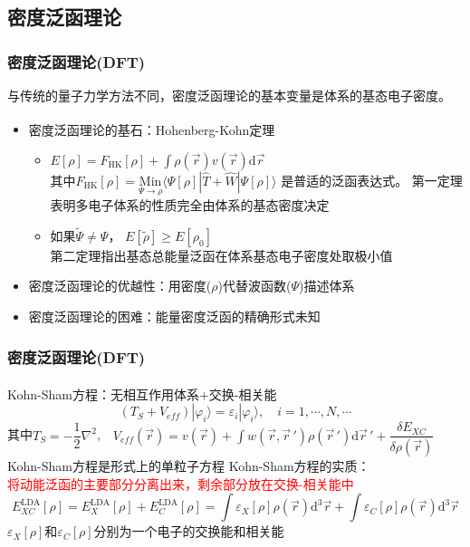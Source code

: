 \documentclass[cjk,slidestop,compress,mathserif,blue]{beamer}
\newcommand{\upcite}[1]{\hspace{0ex}\textsuperscript{\cite{#1}}} %
\begin{document}
\subsection{密度泛函理论}       %
\frame                               %
{
\frametitle{密度泛函理论(\textrm{DFT})} %
与传统的量子力学方法不同，密度泛函理论的基本变量是体系的基态电子密度。%
\begin{itemize}%
	\item 密度泛函理论的基石：\textrm{Hohenberg-Kohn}定理\upcite{PR136-B864_1964}
\vskip 5pt
\begin{itemize}%
   \setlength{\itemsep}{8pt}
 \item $E[\rho]=F_{\mathrm{HK}}[\rho]+\displaystyle\int\rho(\vec{r})v(\vec{r})\textrm{d}\vec{r}$ \\
\vskip 5pt 其中$F_{\mathrm{HK}}[\rho]=\underset{\Psi\to\rho}{\mathrm{Min}}\langle\Psi[\rho]|\hat{T}+\hat{W}|\Psi[\rho]\rangle$
是普适的泛函表达式。%
     \textrm{\small{第一定理表明多电子体系的性质完全由体系的基态密度决定}}
   \item 如果$\tilde\Psi\neq\Psi$，
     $E[\tilde\rho]\geqslant E[\rho_0]$\\
     \textrm{\small{第二定理指出基态总能量泛函在体系基态电子密度处取极小值}}
   \end{itemize}
\vskip 8pt
 \item 密度泛函理论的优越性：用密度($\rho$)代替波函数($\Psi$)描述体系
\vskip 5pt
 \item 密度泛函理论的困难：能量密度泛函的精确形式未知
   \end{itemize}
}
\frame                               %
{
\frametitle{密度泛函理论(\textrm{DFT})}
\textrm{Kohn-Sham}方程\upcite{PR140-A1133_1965}：无相互作用体系+交换-相关能
$$(T_S+V_{e\!f\!f})|\varphi_i\rangle=\varepsilon_i|\varphi_i\rangle,\quad i=1,\cdots,N,\cdots$$
其中$T_S=-\dfrac12\nabla^2$,~~$V_{e\!f\!f}(\vec r)=v(\vec r)+\displaystyle\int w(\vec r,\vec r\,')\rho(\vec r\,')\mathrm{d}\vec r\,'+\dfrac{\delta E_{XC}}{\delta\rho(\vec r)}$
\vskip 10pt
\textrm{Kohn-Sham}方程是形式上的单粒子方程
\vskip 10pt
\textrm{Kohn-Sham}方程的实质：\\\textcolor{red}{将动能泛函的主要部分分离出来，剩余部分放在交换-相关能中}
\begin{displaymath}
	E_{XC}^{\mathrm{LDA}}[\rho]=E_X^{\mathrm{LDA}}[\rho]+E_C^{\mathrm{LDA}}[\rho]=\int\varepsilon_X[\rho]\rho(\vec{r}) \textrm{d}^3\vec{r}+\int\varepsilon_C[\rho]\rho(\vec{r}) \textrm{d}^3\vec{r}
\end{displaymath}
$\varepsilon_X[\rho]$和$\varepsilon_C[\rho]$分别为一个电子的交换能和相关能
}
\end{document}
